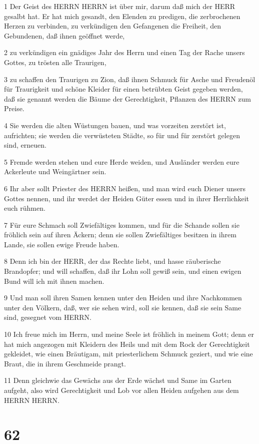 \par 1 Der Geist des HERRN HERRN ist über mir, darum daß mich der HERR gesalbt hat. Er hat mich gesandt, den Elenden zu predigen, die zerbrochenen Herzen zu verbinden, zu verkündigen den Gefangenen die Freiheit, den Gebundenen, daß ihnen geöffnet werde,
\par 2 zu verkündigen ein gnädiges Jahr des Herrn und einen Tag der Rache unsers Gottes, zu trösten alle Traurigen,
\par 3 zu schaffen den Traurigen zu Zion, daß ihnen Schmuck für Asche und Freudenöl für Traurigkeit und schöne Kleider für einen betrübten Geist gegeben werden, daß sie genannt werden die Bäume der Gerechtigkeit, Pflanzen des HERRN zum Preise.
\par 4 Sie werden die alten Wüstungen bauen, und was vorzeiten zerstört ist, aufrichten; sie werden die verwüsteten Städte, so für und für zerstört gelegen sind, erneuen.
\par 5 Fremde werden stehen und eure Herde weiden, und Ausländer werden eure Ackerleute und Weingärtner sein.
\par 6 Ihr aber sollt Priester des HERRN heißen, und man wird euch Diener unsers Gottes nennen, und ihr werdet der Heiden Güter essen und in ihrer Herrlichkeit euch rühmen.
\par 7 Für eure Schmach soll Zwiefältiges kommen, und für die Schande sollen sie fröhlich sein auf ihren Äckern; denn sie sollen Zwiefältiges besitzen in ihrem Lande, sie sollen ewige Freude haben.
\par 8 Denn ich bin der HERR, der das Rechte liebt, und hasse räuberische Brandopfer; und will schaffen, daß ihr Lohn soll gewiß sein, und einen ewigen Bund will ich mit ihnen machen.
\par 9 Und man soll ihren Samen kennen unter den Heiden und ihre Nachkommen unter den Völkern, daß, wer sie sehen wird, soll sie kennen, daß sie sein Same sind, gesegnet vom HERRN.
\par 10 Ich freue mich im Herrn, und meine Seele ist fröhlich in meinem Gott; denn er hat mich angezogen mit Kleidern des Heils und mit dem Rock der Gerechtigkeit gekleidet, wie einen Bräutigam, mit priesterlichem Schmuck geziert, und wie eine Braut, die in ihrem Geschmeide prangt.
\par 11 Denn gleichwie das Gewächs aus der Erde wächst und Same im Garten aufgeht, also wird Gerechtigkeit und Lob vor allen Heiden aufgehen aus dem HERRN HERRN.

\chapter{62}

